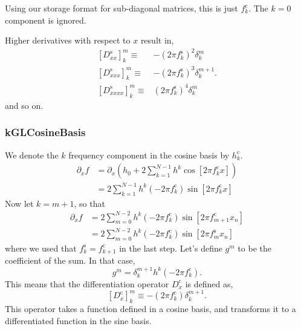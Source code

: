 \documentclass[11pt]{article}
\begin{document}
Using our storage format for sub-diagonal matrices, this is just $f^c_k$. The $k=0$ component is ignored.

Higher derivatives with respect to $x$ result in, 
\begin{align}
\left[D_{xx}^{\textrm{s}}\right]^m_k \equiv& - \left( 2 \pi f_k^{\textrm{s}} \right)^2 \delta^{m}_k \\
\left[D_{xxx}^{\textrm{s}}\right]^m_k \equiv&  - \left( 2 \pi f_k^{\textrm{s}} \right)^3 \delta^{m+1}_k. \\
\left[D_{xxxx}^{\textrm{s}}\right]^m_k \equiv& \left( 2 \pi f_k^{\textrm{s}} \right)^4 \delta^{m}_k 
\end{align}
and so on.

\subsubsection{kGLCosineBasis}

We denote the $k$ frequency component in the cosine basis by $h_k^{\textrm{c}}$.
\begin{align}
\partial_x f&= \partial_x  \left( h_{0} + 2 \sum_{k=1}^{N-1}h^k \cos \left[ 2 \pi f_k^{\textrm{c}} x \right] \right)\\
&= 2 \sum_{k=1}^{N-1} h^k \left( -2 \pi f_k^{\textrm{c}} \right) \sin \left[ 2 \pi f_k^{\textrm{c}} x \right]
\end{align}
Now let $k=m+1$, so that
\begin{align}
\partial_x f &= 2 \sum_{m=0}^{N-2}  h^k \left( -2 \pi f_k^{\textrm{c}} \right)\sin \left[ 2 \pi f_{m+1}^{\textrm{c}} x_n \right] \\
&= 2 \sum_{m=0}^{N-2}  h^k \left( -2 \pi f_k^{\textrm{c}} \right) \sin \left[ 2 \pi f_m^{\textrm{s}} x_n \right]
\end{align}
where we used that $f_k^{\textrm{s}}=f_{k+1}^{\textrm{c}}$ in the last step. Let's define $g^m$ to be the coefficient of the sum. In that case,
\begin{equation}
g^m = \delta^{m+1}_k h^k \left( -2 \pi f_k^{\textrm{c}} \right).
\end{equation}
This means that the differentiation operator $D_x^{\textrm{c}}$ is defined as,
\begin{equation}
\left[D_x^{\textrm{c}}\right]^m_k \equiv - \left( 2 \pi f_k^{\textrm{c}} \right) \delta^{m+1}_k.
\end{equation}
This operator takes a function defined in a cosine basis, and transforms it to a differentiated function in the sine basis.
\end{document}
